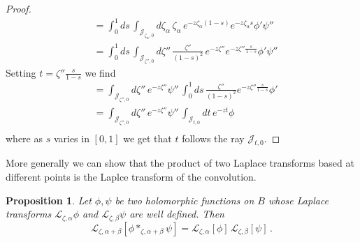 \documentclass{article}
\newcommand{\laplace}{\mathcal{L}}
\theoremstyle{definition}
\theoremstyle{plain}
\newtheorem{prop}[definition]{Proposition}
\begin{document}
\begin{proof}
   \begin{align*}
        &=\int_0^1 ds\,\int_{\mathcal{J}_{\zeta_\alpha,0}}d\zeta_\alpha\,\zeta_\alpha\,e^{-z\zeta_\alpha(1-s)} e^{-z\zeta_\alpha s} \phi' \psi'' \\
        &=\int_0^1 ds\,\int_{\mathcal{J}_{\zeta'',0}}d\zeta''\,\frac{\zeta''}{(1-s)^2}\,e^{-z\zeta''} e^{-z\zeta'' \frac{s}{1-s}} \phi' \psi'' 
   \end{align*}
   Setting $t=\zeta''\frac{s}{1-s}$ we find
    \begin{align*}
        &=\int_{\mathcal{J}_{\zeta'',0}}d\zeta'' \,e^{-z\zeta''}  \psi''\,\int_0^1 ds\,\frac{\zeta''}{(1-s)^2}e^{-z\zeta'' \frac{s}{1-s}} \phi'\\
        &=\int_{\mathcal{J}_{\zeta'',0}}d\zeta'' \,e^{-z\zeta''}  \psi'' \,\int_{\mathcal{J}_{t,0}} dt\, e^{-zt} \phi\\
   \end{align*}
   where as $s$ varies in $[0,1]$ we get that $t$ follows the ray $\mathcal{J}_{t,0}$. 
\end{proof}
More generally we can show that the product of two Laplace transforms based at different points is the Laplce transform of the convolution.
\begin{prop}
Let $\phi,\psi$ be two holomorphic functions on $B$ whose Laplace transforms $\laplace_{\zeta,\alpha}\phi$ and $\laplace_{\zeta,\beta}\psi$ are well defined. Then 
\begin{equation}
    \laplace_{\zeta,\alpha+\beta}[\phi\ast_{\zeta,\alpha+\beta}\psi]=\laplace_{\zeta,\alpha}[\phi]\,\laplace_{\zeta,\beta}[\psi]\,.
\end{equation}    
\end{prop}
\end{document}
